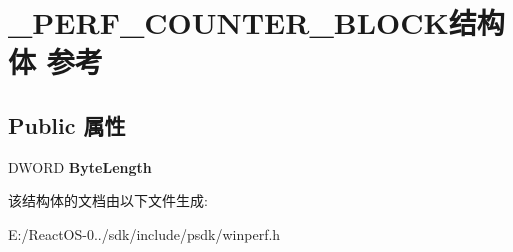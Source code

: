 \hypertarget{struct___p_e_r_f___c_o_u_n_t_e_r___b_l_o_c_k}{}\section{\+\_\+\+P\+E\+R\+F\+\_\+\+C\+O\+U\+N\+T\+E\+R\+\_\+\+B\+L\+O\+C\+K结构体 参考}
\label{struct___p_e_r_f___c_o_u_n_t_e_r___b_l_o_c_k}
\subsection*{Public 属性}
\begin{DoxyCompactItemize}
\item 
\mbox{\label{struct___p_e_r_f___c_o_u_n_t_e_r___b_l_o_c_k_af16dcc46a2301efd12a6a875e37ad1c2}} 
D\+W\+O\+RD {\bfseries Byte\+Length}
\end{DoxyCompactItemize}


该结构体的文档由以下文件生成\+:\begin{DoxyCompactItemize}
\item 
E\+:/\+React\+O\+S-\/0../sdk/include/psdk/winperf.\+h\end{DoxyCompactItemize}
